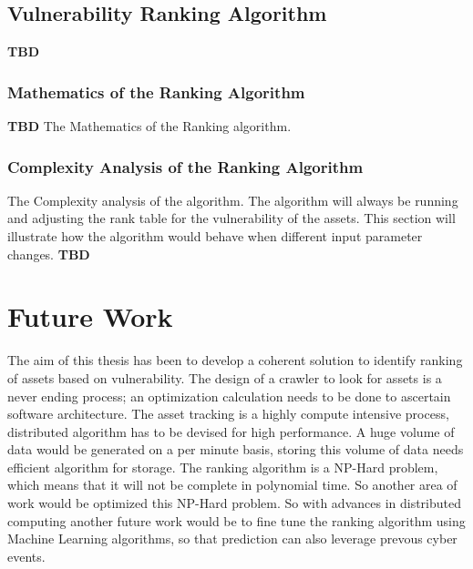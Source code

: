 \subsection{Vulnerability Ranking Algorithm}\label{sec:algo_vul}
\textbf{TBD}
\subsubsection{Mathematics of the Ranking Algorithm}\label{sec:vul_math}
\textbf{TBD}
The Mathematics of the Ranking algorithm.
\subsubsection{Complexity Analysis of the Ranking Algorithm}\label{sec:vul_complex}
The Complexity analysis of the algorithm. The algorithm will always be running and adjusting the rank table for the vulnerability of the assets. This section will illustrate how the algorithm would behave when different input parameter changes.
\textbf{TBD}


\section{Future Work}\label{sec:future_work}
The aim of this thesis has been to develop a coherent solution to identify ranking of assets based on vulnerability. The design of a crawler to look for assets is a never ending process; an optimization calculation needs to be done to ascertain software architecture. The asset tracking is a highly compute intensive process, distributed algorithm has to be devised for high performance. A huge volume of data would be generated on a per minute basis, storing this volume of data needs efficient algorithm for storage. The ranking algorithm is a NP-Hard problem, which means that it will not be complete in polynomial time. So another area of work would be optimized this NP-Hard problem. So with advances in distributed computing another future work would be to fine tune the ranking algorithm using Machine Learning algorithms, so that prediction can also leverage prevous cyber events.


